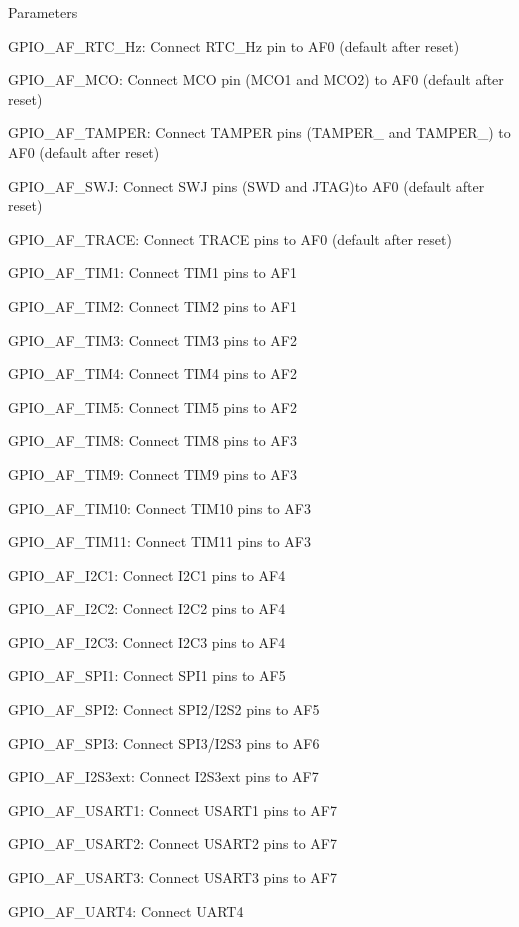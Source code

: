\begin{DoxyParams}{Parameters}
\begin{DoxyItemize}
\item G\-P\-I\-O\-\_\-\-A\-F\-\_\-\-R\-T\-C\-\_\-Hz\-: Connect R\-T\-C\-\_\-Hz pin to A\-F0 (default after reset) \item G\-P\-I\-O\-\_\-\-A\-F\-\_\-\-M\-C\-O\-: Connect M\-C\-O pin (M\-C\-O1 and M\-C\-O2) to A\-F0 (default after reset) \item G\-P\-I\-O\-\_\-\-A\-F\-\_\-\-T\-A\-M\-P\-E\-R\-: Connect T\-A\-M\-P\-E\-R pins (T\-A\-M\-P\-E\-R\-\_ and T\-A\-M\-P\-E\-R\-\_) to A\-F0 (default after reset) \item G\-P\-I\-O\-\_\-\-A\-F\-\_\-\-S\-W\-J\-: Connect S\-W\-J pins (S\-W\-D and J\-T\-A\-G)to A\-F0 (default after reset) \item G\-P\-I\-O\-\_\-\-A\-F\-\_\-\-T\-R\-A\-C\-E\-: Connect T\-R\-A\-C\-E pins to A\-F0 (default after reset) \item G\-P\-I\-O\-\_\-\-A\-F\-\_\-\-T\-I\-M1\-: Connect T\-I\-M1 pins to A\-F1 \item G\-P\-I\-O\-\_\-\-A\-F\-\_\-\-T\-I\-M2\-: Connect T\-I\-M2 pins to A\-F1 \item G\-P\-I\-O\-\_\-\-A\-F\-\_\-\-T\-I\-M3\-: Connect T\-I\-M3 pins to A\-F2 \item G\-P\-I\-O\-\_\-\-A\-F\-\_\-\-T\-I\-M4\-: Connect T\-I\-M4 pins to A\-F2 \item G\-P\-I\-O\-\_\-\-A\-F\-\_\-\-T\-I\-M5\-: Connect T\-I\-M5 pins to A\-F2 \item G\-P\-I\-O\-\_\-\-A\-F\-\_\-\-T\-I\-M8\-: Connect T\-I\-M8 pins to A\-F3 \item G\-P\-I\-O\-\_\-\-A\-F\-\_\-\-T\-I\-M9\-: Connect T\-I\-M9 pins to A\-F3 \item G\-P\-I\-O\-\_\-\-A\-F\-\_\-\-T\-I\-M10\-: Connect T\-I\-M10 pins to A\-F3 \item G\-P\-I\-O\-\_\-\-A\-F\-\_\-\-T\-I\-M11\-: Connect T\-I\-M11 pins to A\-F3 \item G\-P\-I\-O\-\_\-\-A\-F\-\_\-\-I2\-C1\-: Connect I2\-C1 pins to A\-F4 \item G\-P\-I\-O\-\_\-\-A\-F\-\_\-\-I2\-C2\-: Connect I2\-C2 pins to A\-F4 \item G\-P\-I\-O\-\_\-\-A\-F\-\_\-\-I2\-C3\-: Connect I2\-C3 pins to A\-F4 \item G\-P\-I\-O\-\_\-\-A\-F\-\_\-\-S\-P\-I1\-: Connect S\-P\-I1 pins to A\-F5 \item G\-P\-I\-O\-\_\-\-A\-F\-\_\-\-S\-P\-I2\-: Connect S\-P\-I2/\-I2\-S2 pins to A\-F5 \item G\-P\-I\-O\-\_\-\-A\-F\-\_\-\-S\-P\-I3\-: Connect S\-P\-I3/\-I2\-S3 pins to A\-F6 \item G\-P\-I\-O\-\_\-\-A\-F\-\_\-\-I2\-S3ext\-: Connect I2\-S3ext pins to A\-F7 \item G\-P\-I\-O\-\_\-\-A\-F\-\_\-\-U\-S\-A\-R\-T1\-: Connect U\-S\-A\-R\-T1 pins to A\-F7 \item G\-P\-I\-O\-\_\-\-A\-F\-\_\-\-U\-S\-A\-R\-T2\-: Connect U\-S\-A\-R\-T2 pins to A\-F7 \item G\-P\-I\-O\-\_\-\-A\-F\-\_\-\-U\-S\-A\-R\-T3\-: Connect U\-S\-A\-R\-T3 pins to A\-F7 \item G\-P\-I\-O\-\_\-\-A\-F\-\_\-\-U\-A\-R\-T4\-: Connect U\-A\-R\-T4 
\end{DoxyItemize}
\end{DoxyParams}
